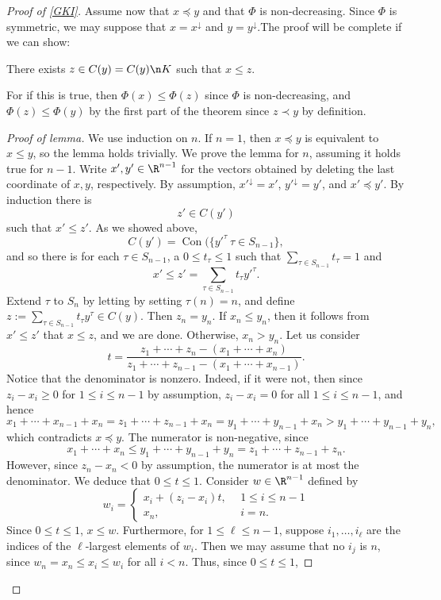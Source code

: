 \documentclass[12pt]{amsart}
\DeclareMathOperator{\Con}{Con}
\begin{document}
\begin{proof}[Proof of \cref{GKI}]
Assume now that $x \preccurlyeq y$ and that $\Phi$ is non-decreasing. Since $\Phi$ is symmetric, we may suppose that $x = x^\downarrow$ and $y = y^\downarrow$.The proof will be complete if we can show:
\begin{lemt}There exists $z \in C(y) = C(y)\n K$ such that $x \leq z$.\end{lemt}
For if this is true, then $\Phi(x) \leq \Phi(z)$ since $\Phi$ is non-decreasing, and $\Phi(z) \leq \Phi(y)$ by the first part of the theorem since $z \prec y$ by definition.
\begin{proof}[Proof of lemma]We use induction on $n$. If $n = 1$, then $x \preccurlyeq y$ is equivalent to $x \leq y$, so the lemma holds trivially. We prove the lemma for $n$, assuming it holds true for $n-1$. Write $x',y' \in \R^{n-1}$ for the vectors obtained by deleting the last coordinate of $x,y$, respectively. By assumption, ${x'}^\downarrow = x'$, ${y'}^\downarrow = y'$, and $x' \preccurlyeq y'$. By induction there is
\[z' \in C(y')\]
such that $x' \leq z'$. As we showed above,
\[C(y') = \Con(\{{y'}^\tau \: \tau \in S_{n-1}\},\] and so
 there is for each $\tau \in S_{n-1}$, a $0 \leq t_\tau \leq 1$ such that $\sum_{\tau \in S_{n-1}} t_\tau = 1$ and
  \[x' \leq z' = \sum_{\tau \in S_{n-1}} t_\tau {y'}^\tau.\]
Extend $\tau$ to $S_n$ by letting by setting $\tau(n) = n$, and define $z := \sum_{\tau \in S_{n-1}} t_\tau y^\tau \in C(y)$. Then $z_n= y_n$. If $x_n \leq y_n$, then it follows from $x' \leq z'$ that $x \leq z$, and we are done. Otherwise, $x_n > y_n$. Let us consider
\[t = \frac{z_1 + \cdots + z_n - (x_1 + \cdots + x_n)}{z_1 + \cdots + z_{n-1} - (x_1 + \cdots + x_{n-1})}.\]
Notice that the denominator is nonzero. Indeed, if it were not, then since $z_i - x_i \geq 0$ for $1 \leq i \leq n-1$ by assumption, $z_i-x_i = 0$ for all $1 \leq i \leq n-1$, and hence
\[x_1 + \cdots + x_{n-1} + x_n = z_1 + \cdots + z_{n-1} + x_n = y_1 + \cdots + y_{n-1} + x_n > y_1 + \cdots + y_{n-1} + y_n,\]
which contradicts $x \preccurlyeq y$.
The numerator is non-negative, since
\[x_1 + \cdots + x_n \leq y_1 + \cdots + y_{n-1} + y_n = z_1 + \cdots + z_{n-1} + z_n.\] However, since $z_n-x_n < 0$ by assumption, the numerator is at most the denominator. We deduce that $0 \leq t \leq 1$. Consider $w \in \R^{n-1}$ defined by
\[w_i = \begin{cases} x_i + (z_i-x_i)t, \ \ &1 \leq i \leq n-1\\
x_n,\ \ &i = n.\end{cases}\]
Since $0 \leq t \leq 1$,  $x \leq w$. Furthermore, for $1 \leq \ell \leq n-1$, suppose $i_1,\ldots,i_\ell$ are the indices of the $\ell$-largest elements of $w_i$. Then we may assume that no $i_j$ is $n$, since $w_n = x_n \leq x_i \leq w_i$ for all $i < n$. Thus, since $0 \leq t \leq 1$,

\end{proof}
\end{proof}
\end{document}
